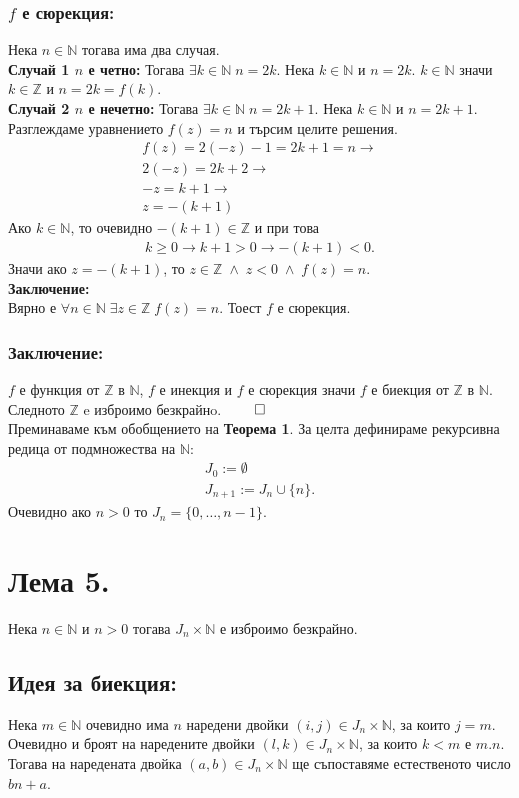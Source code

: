 \documentclass[a4paper, 12pt, oneside]{article}
\newcommand{\N}{\mathbb{N}}
\newcommand{\Z}{\mathbb{Z}}
\begin{document}
\subsubsection*{\(f\) е сюрекция:}
Нека \(n \in \N\) тогава има два случая. \\
\textbf{Случай 1 \(n\) е четно:}
Тогава \(\exists k \in \N \; n = 2k\).
Нека \(k \in \N\) и \(n = 2k\). \(k \in \N\) значи \(k \in \Z\) и \(n = 2k = f(k)\). \\
\textbf{Случай 2 \(n\) е нечетно:}
Тогава \(\exists k \in \N \; n = 2k + 1\).
Нека \(k \in \N\) и \(n = 2k + 1\). 
Разглеждаме уравнението \(f(z) = n\) и търсим целите решения.
\begin{align*}
    f(z) = 2(-z) - 1 = 2k + 1 = n  \longrightarrow \\
    2(-z) = 2k + 2 \longrightarrow \\
    -z = k + 1 \longrightarrow \\
    z = -(k + 1)
\end{align*}
Ако \(k \in \N\), то очевидно \(-(k + 1) \in \Z\) и при това
\begin{align*}
    k \geq 0 \longrightarrow k + 1 > 0 \longrightarrow -(k + 1) < 0.
\end{align*}
Значи ако \(z = -(k + 1)\), то \(z \in \Z \; \land \; z < 0 \; \land \; f(z) = n\). \\
\textbf{Заключение:} \\
Вярно е \(\forall n \in \N \; \exists z \in \Z \; f(z) = n\).
Тоест \(f\) е сюрекция.
\subsubsection*{Заключение:}
\(f\) е функция от \(\Z\)  в \(\N\),  \(f\) е инекция и \(f\) е сюрекция
значи \(f\) е биекция от \(\Z\)  в \(\N\). Следното \(\Z\) e изброимо безкрайнo. \(\qed\) \\
Преминаваме към обобщението на \textbf{Теорема 1}.
За целта дефинираме рекурсивна редица от подмножества на \(\N\):
\begin{align*}
    J_0 := \emptyset \\
    J_{n + 1} := J_n \cup \{n\}.
\end{align*}
Очевидно ако \(n > 0\) то \(J_n = \{0, \dots, n - 1\}\).
\section*{Лема 5.}
Нека \(n \in \N\) и \(n > 0\) тогава \(J_n \times \N\) е изброимо безкрайно.
\subsection*{Идея за биекция:}
Нека \(m \in \N\) очевидно има \(n\) наредени двойки \((i, j) \in J_n \times \N\), за които \(j = m\).
Очевидно и броят на наредените двойки \((l, k) \in J_n \times \N\), за които \(k < m\) е \(m.n\).
Тогава на наредената двойка \((a, b) \in J_n \times \N\) ще съпоставяме естественото число \(bn + a\). 
\end{document}

